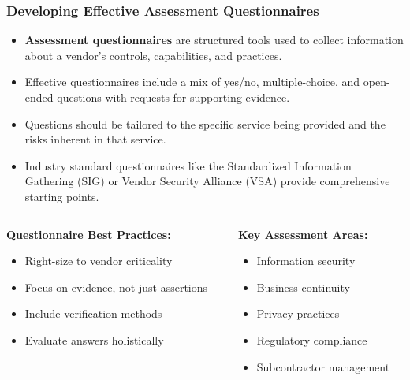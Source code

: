 \documentclass{beamer}
\begin{document}
\begin{frame}
    \frametitle{Developing Effective Assessment Questionnaires}
    
    \begin{itemize}
        \item \textbf{Assessment questionnaires} are structured tools used to collect information about a vendor's controls, capabilities, and practices.
        \item Effective questionnaires include a mix of yes/no, multiple-choice, and open-ended questions with requests for supporting evidence.
        \item Questions should be tailored to the specific service being provided and the risks inherent in that service.
        \item Industry standard questionnaires like the Standardized Information Gathering (SIG) or Vendor Security Alliance (VSA) provide comprehensive starting points.
    \end{itemize}
    
    \begin{columns}
        \scriptsize
        \begin{column}{0.48\textwidth}
            \textbf{Questionnaire Best Practices:}
            \begin{itemize}
                \item Right-size to vendor criticality
                \item Focus on evidence, not just assertions
                \item Include verification methods
                \item Evaluate answers holistically
            \end{itemize}
        \end{column}
        \begin{column}{0.48\textwidth}
            \textbf{Key Assessment Areas:}
            \begin{itemize}
                \item Information security
                \item Business continuity
                \item Privacy practices
                \item Regulatory compliance
                \item Subcontractor management
            \end{itemize}
        \end{column}
    \end{columns}
\end{frame}
\end{document}
